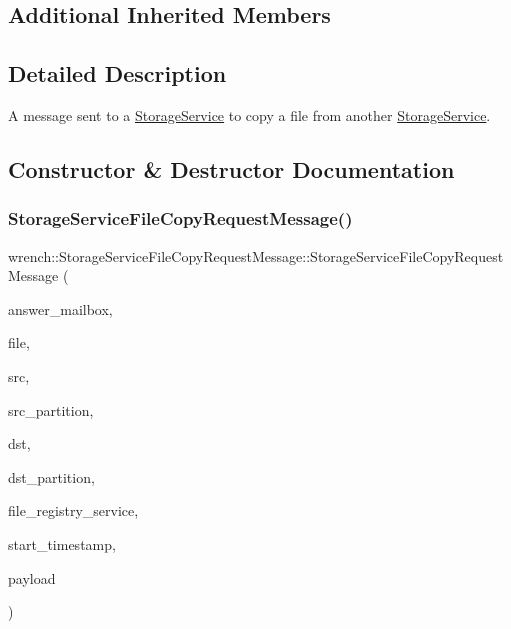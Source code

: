 \subsection*{Additional Inherited Members}


\subsection{Detailed Description}
A message sent to a \hyperlink{classwrench_1_1_storage_service}{Storage\+Service} to copy a file from another \hyperlink{classwrench_1_1_storage_service}{Storage\+Service}. 

\subsection{Constructor \& Destructor Documentation}
\mbox{\label{classwrench_1_1_storage_service_file_copy_request_message_ad48fc46f267f9c0cb5b63ae083514204}} 
\subsubsection{\texorpdfstring{Storage\+Service\+File\+Copy\+Request\+Message()}{StorageServiceFileCopyRequestMessage()}}
{\footnotesize\ttfamily wrench\+::\+Storage\+Service\+File\+Copy\+Request\+Message\+::\+Storage\+Service\+File\+Copy\+Request\+Message (\begin{DoxyParamCaption}\item[{std\+::string}]{answer\+\_\+mailbox,  }\item[{\hyperlink{classwrench_1_1_workflow_file}{Workflow\+File} $\ast$}]{file,  }\item[{\hyperlink{classwrench_1_1_storage_service}{Storage\+Service} $\ast$}]{src,  }\item[{std\+::string \&}]{src\+\_\+partition,  }\item[{\hyperlink{classwrench_1_1_storage_service}{Storage\+Service} $\ast$}]{dst,  }\item[{std\+::string \&}]{dst\+\_\+partition,  }\item[{\hyperlink{classwrench_1_1_file_registry_service}{File\+Registry\+Service} $\ast$}]{file\+\_\+registry\+\_\+service,  }\item[{\hyperlink{classwrench_1_1_simulation_timestamp_file_copy_start}{Simulation\+Timestamp\+File\+Copy\+Start} $\ast$}]{start\+\_\+timestamp,  }\item[{double}]{payload }\end{DoxyParamCaption})}



